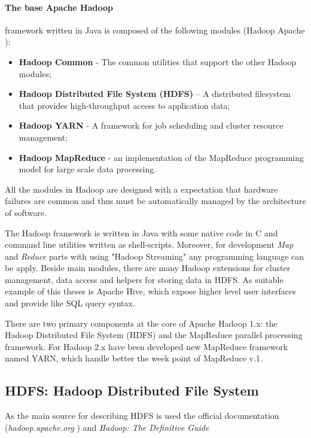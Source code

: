 \documentclass[a4paper,12pt,oneside]{report}
\begin{document}
	\paragraph*{The base Apache Hadoop}framework written in Java is composed of the
	following modules (Hadoop Apache \cite{hadoop_web}):
	\begin{itemize}
		\item \textbf{Hadoop Common} - The common utilities that support the other
		Hadoop modules;
		\item \textbf{Hadoop Distributed File System (HDFS)} – A distributed filesystem
		that provides
		high-throughput access to application data;
		\item \textbf{Hadoop YARN} - A framework for job scheduling and cluster resource
		management;
		\item \textbf{Hadoop MapReduce} - an implementation of the MapReduce programming
		model 
		for large scale data processing.
	\end{itemize}
	All the modules in Hadoop are designed with a expectation that hardware failures
	are common and thus 
	must be automatically managed by the architecture of  software.
	
	The Hadoop framework is written in Java with some native code in C and command
	line utilities written 
	as shell-scripts. Moreover, for development \textit{Map} and \textit{Reduce}
	parts  
	with using "Hadoop Streaming" any programming language can be apply. 
	Beside main modules, there are many Hadoop extensions for cluster management,
	data access and helpers for storing data in HDFS. As suitable example of this
	theses is Apache Hive, 
	which expose higher level user interfaces and provide like SQL query syntax. 
	
	There are two primary components at the core of Apache Hadoop 1.x: the Hadoop
	Distributed File System 
	(HDFS) and the MapReduce parallel processing framework. For Hadoop 2.x have been
	developed new MapReduce 
	framework named YARN, which handle better the week point of MapReduce v.1.
	
	
	\subsection{HDFS: Hadoop Distributed File System}\label{subsec:hdfs}
	As the main source for describing HDFS is used the official documentation
	(\textit{hadoop.apache.org} 
	\cite{hadoop_web}) and  \textit{Hadoop: The Definitive
		Guide}\cite{hadoop_definitive}
	
\end{document}
